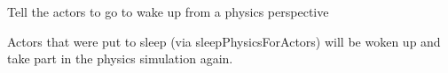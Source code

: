 \documentclass[letterpaper,10pt,english]{sphinxmanual}
\begin{document}
\begin{fulllineitems}
\begin{fulllineitems}
\end{fulllineitems}


\begin{fulllineitems}
\label{world:serge.world.World.wakePhysicsForActors}
Tell the actors to go to wake up from a physics perspective

Actors that were put to sleep (via sleepPhysicsForActors) will be woken
up and take part in the physics simulation again.

\end{fulllineitems}


\end{fulllineitems}
\end{document}
